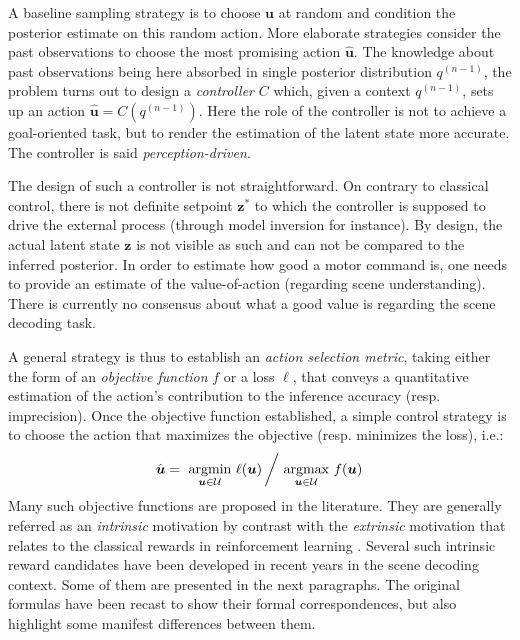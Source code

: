 \documentclass[12pt,twoside,openright]{article}
\begin{document}
A baseline sampling strategy is to choose $\boldsymbol{u}$ at random and condition the posterior  estimate on this random action. 
More elaborate strategies consider the past observations
to choose the most promising action $\hat{\boldsymbol{u}}$. 
The knowledge about past observations being here absorbed in single posterior distribution $q^{(n-1)}$, the problem turns out to design  a \emph{controller} $C$ which, given a context $q^{(n-1)}$, sets up an action $\hat{\boldsymbol{u}} = C(q^{(n-1)})$. Here the role of the controller is not to achieve a goal-oriented task, but to render the estimation of the latent state more accurate. The controller is said \emph{perception-driven}. 

The design of such a controller is not straightforward. On contrary to classical control, there is not definite setpoint $\boldsymbol{z}^*$ to which the controller is supposed to drive the external process (through model inversion for instance). By design, the actual latent state $\boldsymbol{z}$ is not visible as such and can not be compared to the inferred posterior. In order to estimate how good a motor command is, one needs to provide an estimate of the value-of-action (regarding scene understanding). There is currently no consensus about what a good value is regarding the scene decoding task. 

A general strategy is thus to establish an \emph{action selection metric}, taking either the form of an \emph{objective function} $f$ or a loss $\ell$, that conveys a quantitative estimation of the action's contribution to the inference accuracy (resp. imprecision). Once the objective function established, a simple control strategy is to choose the action that maximizes the objective (resp. minimizes the loss), i.e.:
\begin{align}
\hat{\boldsymbol{u}} = \underset{\boldsymbol{u}\in\mathcal{U}}{\text{ argmin }}  \ell(\boldsymbol{u})\left/ \underset{\boldsymbol{u}\in\mathcal{U}}{\text{ argmax }}  f(\boldsymbol{u})\right.
\end{align}
Many such objective functions are proposed in the literature. They are generally referred as an \emph{intrinsic} motivation \citep{oudeyer2008can} by contrast with the \emph{extrinsic} motivation that relates to the classical rewards in reinforcement learning \citep{sutton1998reinforcement}. Several such intrinsic reward candidates have been developed in recent years in the scene decoding context. Some of them are presented in the next paragraphs. The original formulas have been recast to show their formal correspondences, but also highlight some manifest differences between them.
\end{document}

